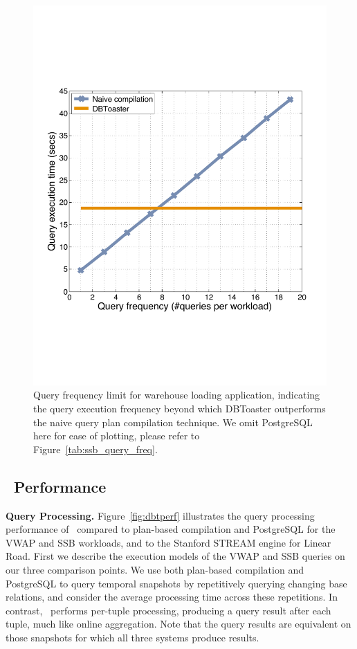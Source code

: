 \begin{figure}[tb]
\begin{center}
\includegraphics[scale=0.4]{../plots/ssb_query_freq_dn.pdf}
\end{center}
\vspace{-4mm}
\caption{Query frequency limit for warehouse loading application, indicating the
query execution frequency beyond which DBToaster outperforms the naive query
plan compilation technique. We omit PostgreSQL here for ease of
plotting, please refer to Figure~\ref{tab:ssb_query_freq}.}
\label{fig:ssb_query_freq}
\end{figure}



\subsection{\compiler\ Performance}

\textbf{Query Processing.}
Figure~\ref{fig:dbtperf} illustrates the query processing performance of
\compiler\ compared to plan-based compilation and PostgreSQL for the VWAP and SSB
workloads, and to the Stanford STREAM engine for Linear Road. First we describe
the execution models of the VWAP and SSB queries on our three comparison points.
We use both plan-based compilation and PostgreSQL to query temporal snapshots by
repetitively querying changing base relations, and consider the average
processing time across these repetitions. In contrast, \compiler\ performs
per-tuple processing, producing a query result after each tuple, much like online
aggregation. Note that the query results are equivalent on those snapshots for
which all three systems produce results.

